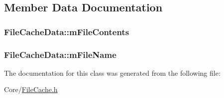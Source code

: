 \subsection{Member Data Documentation}
\subsubsection[{\texorpdfstring{m\+File\+Contents}{mFileContents}}]{ File\+Cache\+Data\+::m\+File\+Contents\hspace{0.3cm}{\ttfamily [private]}}\hypertarget{classFileCacheData_a409bbf6beaa7225e510f63b9d9101bb0}{}\label{classFileCacheData_a409bbf6beaa7225e510f63b9d9101bb0}
\subsubsection[{\texorpdfstring{m\+File\+Name}{mFileName}}]{ File\+Cache\+Data\+::m\+File\+Name\hspace{0.3cm}{\ttfamily [private]}}\hypertarget{classFileCacheData_aee99122549505bb51d7ab1f502878612}{}\label{classFileCacheData_aee99122549505bb51d7ab1f502878612}


The documentation for this class was generated from the following file\+:\begin{DoxyCompactItemize}
\item 
Core/\hyperlink{FileCache_8h}{File\+Cache.\+h}\end{DoxyCompactItemize}
